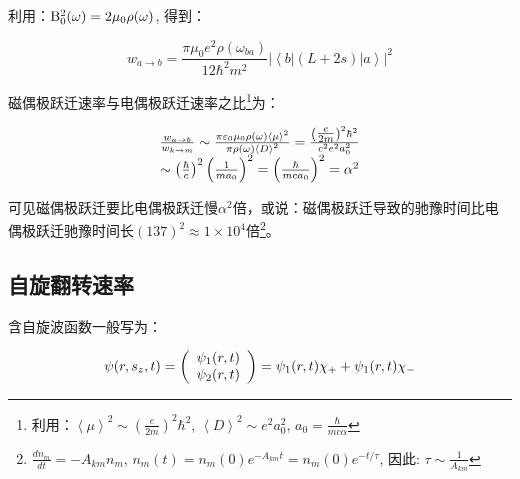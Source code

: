 利用：${\rm B}_0^2 (\omega ) = 2\mu _0 \rho (\omega )$, 得到：

\begin{equation}\label{25-25}
w_{a \to b}  = \frac{{\pi \mu _0 e^2 \rho (\omega _{ba} )}}{{12\hbar
^2 m^2 }} | \left\langle b \right|\left. {\left( {L + 2s} \right)}
\right|\left. a \right\rangle |^2
\end{equation}

磁偶极跃迁速率与电偶极跃迁速率之比\footnote{利用：$\left\langle \mu  \right\rangle ^2  \sim \left( {\frac{e}{{2m}}} \right)^2 \hbar ^2 $, $\left\langle D \right\rangle ^2  \sim e^2 a_0^2 $, $a_0  = \frac{\hbar }{{mc\alpha }}$}为：

\begin{equation}\label{25-26}
\begin{array}{c}
\frac{{w_{a \to b} }}{{w_{k \to m} }} \sim \frac{{\pi \varepsilon _0 \mu _0 \rho (\omega )\left\langle \mu  \right\rangle ^2 }}{{\pi \rho (\omega )\left\langle D \right\rangle ^2 }} = \frac{{\left( {{\textstyle{e \over {2m}}}} \right)^2 \hbar ^2 }}{{c^2 e^2 a_0^2 }} \\
\sim \left( {\frac{\hbar }{c}} \right)^2 \left( {\frac{1}{{ma_0 }}} \right)^2  = \left( {\frac{\hbar }{{mca_0 }}} \right)^2  = \alpha ^2 \\
\end{array}
\end{equation}

可见磁偶极跃迁要比电偶极跃迁慢$\alpha ^2 $倍，或说：磁偶极跃迁导致的驰豫时间比电偶极跃迁驰豫时间长$\left( {137} \right)^2  \approx 1 \times 10^4 $倍\footnote{$\frac{{dn_m }}{{dt}} =  - A_{km} n_m $, $n_m (t) = n_m (0)e^{ - A_{km} t}  = n_m (0)e^{ - t/\tau } $, 因此: $\tau  \sim \frac{1}{{A_{km} }}$}。

\subsection{自旋翻转速率}

含自旋波函数一般写为：


\begin{equation}\label{25-27}
\psi (r,s_z ,t) = \left( {\begin{array}{*{20}c}
   {\psi _1 (r,t)}  \\
   {\psi _2 (r,t)}  \\
\end{array}} \right) = \psi _1 (r,t)\chi _ +   + \psi _1 (r,t)\chi _ -
\end{equation}

